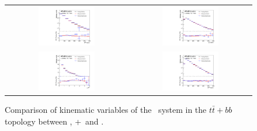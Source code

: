 \begin{figure}[p]
\begin{center}
\begin{tabular}{cc}
\includegraphics[width=0.48\textwidth]{Modeling/Figures/default_tt2bq_qq_m_norm} &
\includegraphics[width=0.48\textwidth]{Modeling/Figures/default_tt2bq_qq_pt_norm} \\
\includegraphics[width=0.48\textwidth]{Modeling/Figures/default_tt2bq_qq_dr_norm} &
\includegraphics[width=0.48\textwidth]{Modeling/Figures/default_tt2bq_qq_ht_norm} \\
\end{tabular}
\caption{Comparison of kinematic variables of the \bbbar\ system in the $t\bar{t}+bb$ topology between \PP, \madgraph+\pythia\ and \ShOL.}
\label{fig:default_tt2b_bb}
\end{center}
\end{figure}
